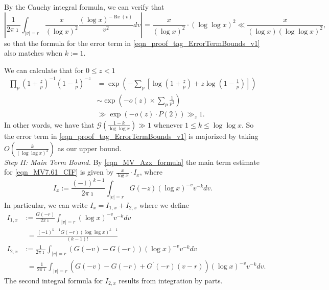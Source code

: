 \documentclass[11pt,reqno,a4letter]{article}
\numberwithin{figure}{section}
\numberwithin{table}{section}
\theoremstyle{plain}
\numberwithin{theorem}{section}
\theoremstyle{definition}
\renewcommand{\Re}{\operatorname{Re}}
\begin{document}
By the Cauchy integral formula, we can verify that 
\[
\left\lvert \frac{1}{2\pi\imath} \int_{|v|=r} 
     \frac{x}{(\log x)^2} \frac{(\log x)^{-\Re(v)}}{v^{2}} dv \right\rvert = 
     \frac{x}{(\log x)^2} \cdot (\log\log x)^2 \ll 
     \frac{x}{(\log x) (\log\log x)^2}, 
\]
so that the formula for the error term in \eqref{eqn_proof_tag_ErrorTermBounds_v1} 
also matches when $k := 1$. 

We can calculate that for $0 \leq z < 1$ 
\begin{align*} 
\prod_p \left(1 + \frac{z}{p}\right)^{-1} \left(1 - \frac{1}{p}\right)^{-z} & = 
     \exp\left(-\sum_p \left[\log\left(1 + \frac{z}{p}\right) + z 
     \log\left(1 - \frac{1}{p}\right) \right]\right) \\ 
     & \sim \exp\left(-o(z) \times \sum_p \frac{1}{p^2}\right) \\ 
     & \gg \exp\left(-o(z) \cdot P(2)\right) \gg_z 1. 
\end{align*} 
In other words, we have that 
$\mathcal{G}\left(\frac{1-k}{\log\log x}\right) \gg 1$ whenever $1 \leq k \leq \log\log x$. 
So the error term in \eqref{eqn_proof_tag_ErrorTermBounds_v1} 
is majorized by taking $O\left(\frac{k}{(\log\log x)^3}\right)$ as our 
upper bound. \\ 
\textit{Step II: Main Term Bound.} 
By \eqref{eqn_MV_Azx_formula} the main term 
estimate for \eqref{eqn_MV7.61_CIF} 
is given by $\frac{x}{\log x} \cdot I_x$, where 
\[
I_x := \frac{(-1)^{k-1}}{2\pi\imath} \int_{|v|=r} G(-z) (\log x)^{-v} v^{-k} dv. 
\]
In particular, we can write $I_x = I_{1,x} + I_{2,x}$ where we define 
\begin{align*} 
I_{1,x} & := \frac{G(-r)}{2\pi\imath} \int_{|v|=r} (\log x)^{-v} v^{-k} dv \\ 
    & \phantom{:}= \frac{(-1)^{k-1} G(-r) (\log\log x)^{k-1}}{(k-1)!} \\ 
I_{2,x} & := \frac{1}{2\pi\imath} \int_{|v|=r} (G(-v) - G(-r)) (\log x)^{-v} v^{-k} dv \\ 
    & \phantom{:}= \frac{1}{2\pi\imath} \int_{|v|=r} (G(-v) - G(-r) + G^{\prime}(-r) (v-r)) 
    (\log x)^{-v} v^{-k} dv. 
\end{align*} 
The second integral formula for $I_{2,x}$ results from integration by parts. 
\end{document}
